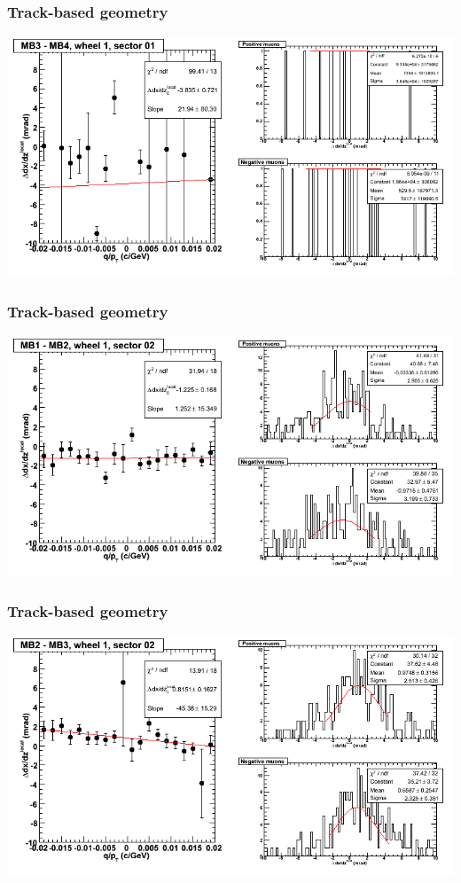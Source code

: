 \documentclass[compress]{beamer}
\begin{document}
\begin{frame}
\frametitle{Track-based geometry}
\includegraphics[width=\linewidth]{NOV4_segdiffs/dt13_slope_D_01_34.png}
\end{frame}

\begin{frame}
\frametitle{Track-based geometry}
\includegraphics[width=\linewidth]{NOV4_segdiffs/dt13_slope_D_02_12.png}
\end{frame}

\begin{frame}
\frametitle{Track-based geometry}
\includegraphics[width=\linewidth]{NOV4_segdiffs/dt13_slope_D_02_23.png}
\end{frame}
\end{document}
